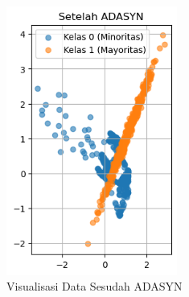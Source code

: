 \begin{figure}[H]
	\centering
	\includegraphics[width=0.5\textwidth]{figure/visualisasi_data_sesudah_adasyn.png}
	\caption{Visualisasi Data Sesudah ADASYN}
	\label{fig:2.visualisasidatasesudahadasyn}
\end{figure}

